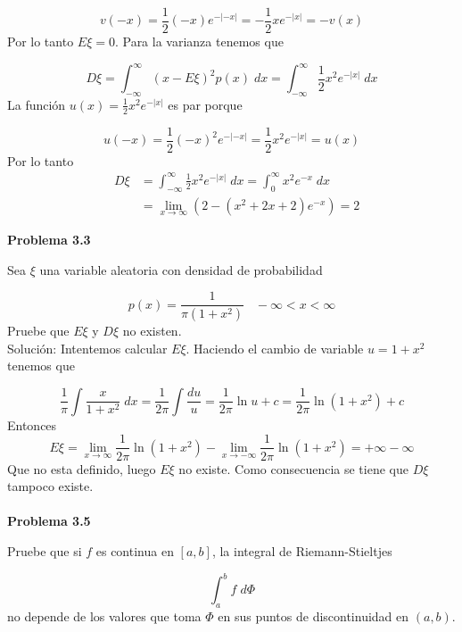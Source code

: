 \documentclass[12pt]{article}
\begin{document}
    \[v(-x) = \frac{1}{2}(-x)e^{-|-x|} = -\frac{1}{2}xe^{-|x|} = -v(x)\]
    Por lo tanto $E\xi = 0$. Para la varianza tenemos que 

    \[D\xi = \int_{-\infty}^{\infty} (x-E\xi)^2p(x)\;dx = \int_{-\infty}^{\infty}\frac{1}{2}x^2e^{-|x|}\;dx\]
    La funci\'on $u(x) = \frac{1}{2}x^2e^{-|x|}$ es par porque

    \[u(-x) = \frac{1}{2}(-x)^2e^{-|-x|} = \frac{1}{2}x^2e^{-|x|} = u(x)\]
    Por lo tanto 
    \begin{equation*}
        \begin{aligned}
            & D\xi & = \int_{-\infty}^{\infty} \frac{1}{2}x^2e^{-|x|}\;dx = \int_0^{\infty}x^2e^{-x}\;dx \\
            & & = \lim_{x\rightarrow \infty} (2-(x^2+2x+2)e^{-x}) = 2
        \end{aligned}
    \end{equation*}
    \newpage

    \textbf{Problema 3.3}

    Sea $\xi$ una variable aleatoria con densidad de probabilidad

    \[p(x) = \frac{1}{\pi(1+x^2)}\;\;\; -\infty < x < \infty\]
    Pruebe que $E\xi$ y $D\xi$ no existen.
    \\

    Soluci\'on: Intentemos calcular $E\xi$. Haciendo el cambio de variable $u = 1+x^2$
    tenemos que 

    \[\frac{1}{\pi}\int \frac{x}{1+x^2}\;dx = \frac{1}{2\pi}\int \frac{du}{u} = \frac{1}{2\pi} \ln u +c= \frac{1}{2\pi} \ln (1+x^2)+c\]
    Entonces 
    \[E\xi = \lim_{x\rightarrow \infty}\frac{1}{2\pi} \ln (1+x^2)-\lim_{x\rightarrow -\infty}\frac{1}{2\pi} \ln (1+x^2) = +\infty-\infty\]
    Que no esta definido, luego $E\xi$ no existe. Como consecuencia se tiene que $D\xi$ 
    tampoco existe.
    \\ \\ 

    \textbf{Problema 3.5}

    Pruebe que si $f$ es continua en $[a,b]$, la integral de Riemann-Stieltjes

    \[\int_a^b f\;d\Phi\]
    no depende de los valores que toma $\Phi$ en sus puntos de discontinuidad en $(a,b)$.
    \\
\end{document}
